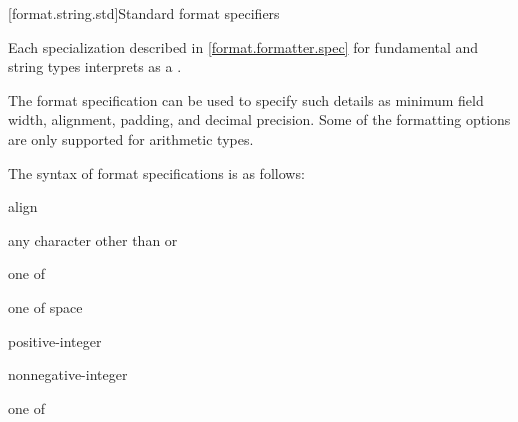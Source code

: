[format.string.std]{Standard format specifiers}

\pnum
Each  specialization
described in \ref{format.formatter.spec}
for fundamental and string types
interprets  as a
.
\begin{note}
The format specification can be used to specify such details as
minimum field width, alignment, padding, and decimal precision.
Some of the formatting options
are only supported for arithmetic types.
\end{note}
The syntax of format specifications is as follows:

\begin{ncbnf}
\br
      \opt{\terminal{\#}}     
\end{ncbnf}

\begin{ncbnf}
\br
     align
\end{ncbnf}

\begin{ncbnf}
\br
    \textnormal{any character other than \tcode{\{} or \tcode{\}}}
\end{ncbnf}

\begin{ncbnf}
 \textnormal{one of}\br
    \terminal{< > \caret}
\end{ncbnf}

\begin{ncbnf}
 \textnormal{one of}\br
    \terminal{+ -} \textnormal{space}
\end{ncbnf}

\begin{ncbnf}
\br
    positive-integer\br
    \terminal{\{}  \terminal{\}}
\end{ncbnf}

\begin{ncbnf}
\br
     nonnegative-integer\br
     \terminal{\{}  \terminal{\}}
\end{ncbnf}

\begin{ncbnf}
 \textnormal{one of}\br
\end{ncbnf}

